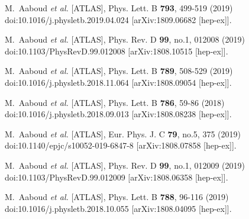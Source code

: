 \begin{thebibliography}{9}
M.~Aaboud \textit{et al.} [ATLAS],
Phys. Lett. B \textbf{793}, 499-519 (2019)
doi:10.1016/j.physletb.2019.04.024
[arXiv:1809.06682 [hep-ex]].

M.~Aaboud \textit{et al.} [ATLAS],
Phys. Rev. D \textbf{99}, no.1, 012008 (2019)
doi:10.1103/PhysRevD.99.012008
[arXiv:1808.10515 [hep-ex]].

M.~Aaboud \textit{et al.} [ATLAS],
Phys. Lett. B \textbf{789}, 508-529 (2019)
doi:10.1016/j.physletb.2018.11.064
[arXiv:1808.09054 [hep-ex]].

M.~Aaboud \textit{et al.} [ATLAS],
Phys. Lett. B \textbf{786}, 59-86 (2018)
doi:10.1016/j.physletb.2018.09.013
[arXiv:1808.08238 [hep-ex]].

M.~Aaboud \textit{et al.} [ATLAS],
Eur. Phys. J. C \textbf{79}, no.5, 375 (2019)
doi:10.1140/epjc/s10052-019-6847-8
[arXiv:1808.07858 [hep-ex]].

M.~Aaboud \textit{et al.} [ATLAS],
Phys. Rev. D \textbf{99}, no.1, 012009 (2019)
doi:10.1103/PhysRevD.99.012009
[arXiv:1808.06358 [hep-ex]].

M.~Aaboud \textit{et al.} [ATLAS],
Phys. Lett. B \textbf{788}, 96-116 (2019)
doi:10.1016/j.physletb.2018.10.055
[arXiv:1808.04095 [hep-ex]].


\end{thebibliography}
